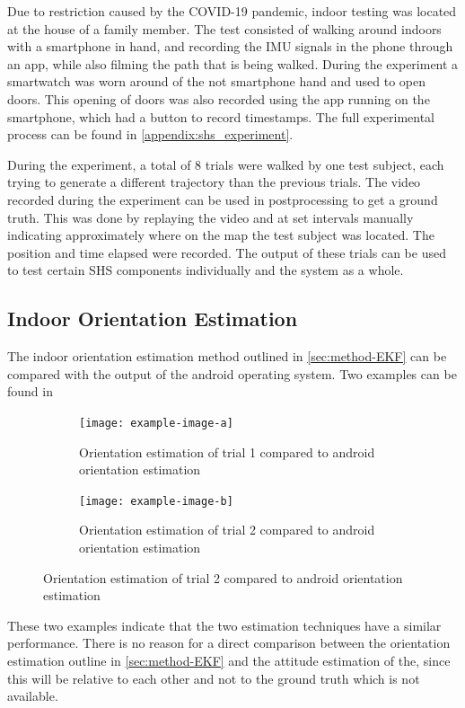 Due to restriction caused by the COVID-19 pandemic, indoor testing was located at the house of a family member. The test consisted of walking around indoors with a smartphone in hand, and recording the IMU signals in the phone through an app, while also filming the path that is being walked. During the experiment a smartwatch was worn around of the not smartphone hand and used to open doors. This opening of doors was also recorded using the app running on the smartphone, which had a button to record timestamps. The full experimental process can be found in \cref{appendix:shs_experiment}. \par 

During the experiment, a total of 8 trials were walked by one test subject, each trying to generate a different trajectory than the previous trials. The video recorded during the experiment can be used in postprocessing to get a ground truth. This was done by replaying the video and at set intervals manually indicating approximately where on the map the test subject was located. The position and time elapsed were recorded. The output of these trials can be used to test certain SHS components individually and the system as a whole.



\subsection{Indoor Orientation Estimation}
The indoor orientation estimation method outlined in \cref{sec:method-EKF} can be compared with the output of the android operating system. Two examples can be found in 

\begin{figure}[H]
	\centering
	\begin{subfigure}[t]{.45\textwidth}
	\centering
	\texttt{[image: example-image-a]}
	\caption{Orientation estimation of trial 1 compared to android orientation estimation}
	\label{fig:trail1 - shs}
\end{subfigure}\quad
\begin{subfigure}[t]{.45\textwidth}
	\centering
	\texttt{[image: example-image-b]}
	\caption{Orientation estimation of trial 2 compared to android orientation estimation}
	\label{fig:trail2 - shs}
\end{subfigure}
\end{figure}

These two examples indicate that the two estimation techniques have a similar performance. There is no reason for a direct comparison between the orientation estimation outline in \cref{sec:method-EKF} and the attitude estimation of the, since this will be relative to each other and not to the ground truth which is not available. 

